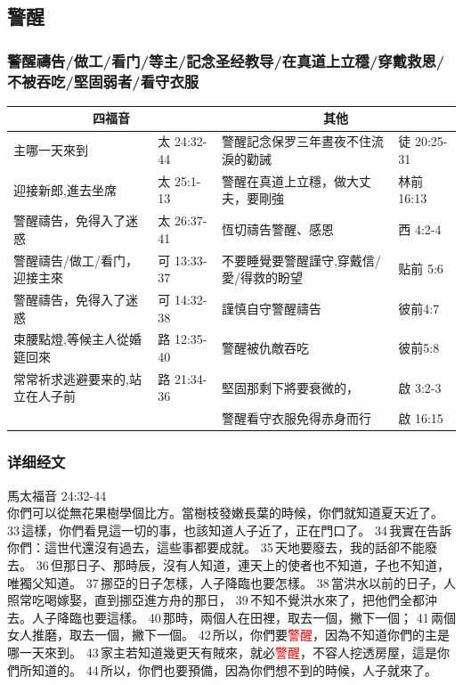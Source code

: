 \subsection{警醒}
\subsubsection{警醒禱告/做工/看门/等主/記念圣经教导/在真道上立穩/穿戴救恩/不被吞吃/堅固弱者/看守衣服}
\begin{table}[H]
\centering
\begin{tabular}{l|l|l|l}\hline
\multicolumn{2}{c|}{四福音} & \multicolumn{2}{c}{其他} \\\hline\hline
主哪一天來到& 太 24:32-44&警醒記念保罗三年晝夜不住流淚的勸誡& 徒 20:25-31\\\hline
迎接新郎,進去坐席& 太 25:1-13&警醒在真道上立穩，做大丈夫，要剛強&林前16:13 \\\hline
警醒禱告，免得入了迷惑& 太 26:37-41&恆切禱告警醒、感恩&西 4:2-4 \\\hline
警醒禱告/做工/看门，迎接主來& 可 13:33-37&不要睡覺要警醒謹守,穿戴信/愛/得救的盼望&贴前 5:6 \\\hline
警醒禱告，免得入了迷惑& 可 14:32-38&謹慎自守警醒禱告& 彼前4:7\\\hline
束腰點燈,等候主人從婚筵回來& 路 12:35-40&警醒被仇敵吞吃&彼前5:8 \\\hline
常常祈求逃避要来的,站立在人子前& 路 21:34-36&堅固那剩下將要衰微的，& 啟 3:2-3\\\hline
& &警醒看守衣服免得赤身而行&啟 16:15 \\\hline\hline
\end{tabular}
\end{table}

\subsubsection{详细经文}
馬太福音 24:32-44\\
你們可以從無花果樹學個比方。當樹枝發嫩長葉的時候，你們就知道夏天近了。 33 這樣，你們看見這一切的事，也該知道人子近了，正在門口了。 34 我實在告訴你們：這世代還沒有過去，這些事都要成就。 35 天地要廢去，我的話卻不能廢去。 36 但那日子、那時辰，沒有人知道，連天上的使者也不知道，子也不知道，唯獨父知道。 37 挪亞的日子怎樣，人子降臨也要怎樣。 38 當洪水以前的日子，人照常吃喝嫁娶，直到挪亞進方舟的那日， 39 不知不覺洪水來了，把他們全都沖去。人子降臨也要這樣。 40 那時，兩個人在田裡，取去一個，撇下一個； 41 兩個女人推磨，取去一個，撇下一個。 42 所以，你們要\textcolor{red}{警醒}，因為不知道你們的主是哪一天來到。 43 家主若知道幾更天有賊來，就必\textcolor{red}{警醒}，不容人挖透房屋，這是你們所知道的。 44 所以，你們也要預備，因為你們想不到的時候，人子就來了。


